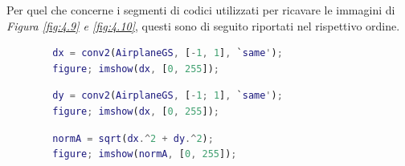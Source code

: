 \documentclass{subfiles}
\begin{document}
Per quel che concerne i segmenti di codici utilizzati per ricavare le immagini di \emph{Figura \ref{fig:4.9} \emph{e} \ref{fig:4.10}},
questi sono di seguito riportati nel rispettivo ordine.
\begin{center}
    \begin{lstlisting}[language = MATLAB]
        % caricamento di AirplaneGS.png
        dx = conv2(AirplaneGS, [-1, 1], `same');
        figure; imshow(dx, [0, 255]);
    \end{lstlisting}
    \begin{lstlisting}[language = MATLAB]
        % caricamento di AirplaneGS.png
        dy = conv2(AirplaneGS, [-1; 1], `same');
        figure; imshow(dx, [0, 255]);
    \end{lstlisting}
    \begin{lstlisting}[language = MATLAB]
        % dx e dy sono le immagine sin ora calcolate
        normA = sqrt(dx.^2 + dy.^2);
        figure; imshow(normA, [0, 255]);
    \end{lstlisting}
\end{center}
\end{document}
